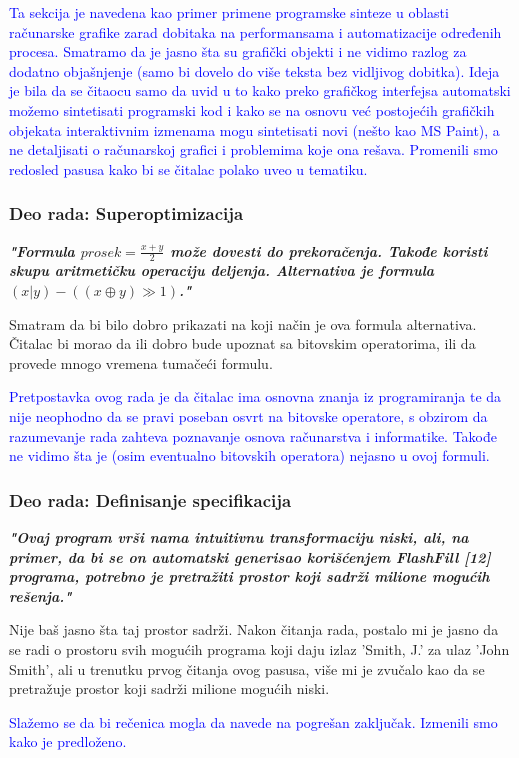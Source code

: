 \documentclass[a4paper]{report}
\newcommand{\odgovor}[1]{\textcolor{blue}{#1}}
\begin{document}
\odgovor{Ta sekcija je navedena kao primer primene programske sinteze u oblasti računarske grafike zarad dobitaka na performansama i automatizacije određenih procesa. Smatramo da je jasno šta su grafički objekti i ne vidimo razlog za dodatno objašnjenje (samo bi dovelo do više teksta bez vidljivog dobitka).  Ideja je bila da se čitaocu samo da uvid u to kako preko grafičkog interfejsa automatski možemo sintetisati programski kod i kako se na osnovu već postojećih grafičkih objekata interaktivnim izmenama mogu sintetisati novi (nešto kao MS Paint), a ne detaljisati o računarskoj grafici i problemima koje ona rešava. Promenili smo redosled pasusa kako bi se čitalac polako uveo u tematiku.}


\subsubsection{Deo rada: Superoptimizacija}
\textbf{\textit{"Formula $prosek = \frac{x+y}{2}$ može dovesti do prekoračenja. Takođe koristi skupu aritmetičku operaciju deljenja. Alternativa je formula $(x | y) - ((x \oplus y) \gg 1)$."}}

Smatram da bi bilo dobro prikazati na koji način je ova formula alternativa. Čitalac bi morao da ili dobro bude upoznat sa bitovskim operatorima, ili da provede mnogo vremena tumačeći formulu.

\odgovor {Pretpostavka ovog rada je da čitalac ima osnovna znanja iz programiranja te da nije neophodno da se pravi poseban osvrt na bitovske operatore, s obzirom da razumevanje rada zahteva poznavanje osnova računarstva i informatike. Takođe ne vidimo šta je (osim eventualno bitovskih operatora) nejasno u ovoj formuli.}


\subsubsection{Deo rada: Definisanje specifikacija}
\textbf{\textit{"Ovaj program vrši nama intuitivnu transformaciju niski, ali, na primer, da bi se on automatski generisao korišćenjem FlashFill [12] programa, potrebno je pretražiti prostor koji sadrži milione mogućih rešenja."}}

Nije baš jasno šta taj prostor sadrži. Nakon čitanja rada, postalo mi je jasno da se radi o prostoru svih mogućih programa koji daju izlaz 'Smith, J.' za ulaz 'John Smith', ali u trenutku prvog čitanja ovog pasusa, više mi je zvučalo kao da se pretražuje prostor koji sadrži milione mogućih niski.

\odgovor {Slažemo se da bi rečenica mogla da navede na pogrešan zaključak. Izmenili smo kako je predloženo.}
\end{document}
